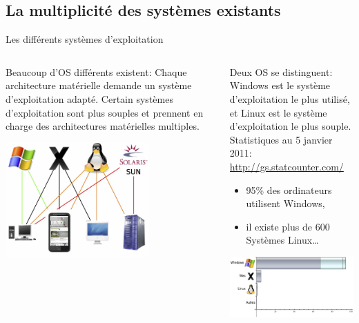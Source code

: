 \subsection{La multiplicité des systèmes existants}
\begin{frame}{Les différents systèmes d'exploitation}
  \begin{columns}
    \begin{column}{5.5cm}
      \begin{block}{Beaucoup d'OS différents existent:}
        Chaque architecture matérielle  demande un système d'exploitation adapté. Certain systèmes d'exploitation sont plus souples et prennent en charge des architectures matérielles multiples.
      \end{block}
      \begin{center}
        \includegraphics[width=5.5cm]{img/s01/OS_archi.jpg}
      \end{center}
    \end{column}
    \begin{column}{5.5cm}
      \begin{block}{Deux OS se distinguent:}
        Windows est le système d'exploitation le plus utilisé, et Linux est le système d'exploitation le plus souple.\\
        Statistiques au 5 janvier 2011: \url{http://gs.statcounter.com/}\\
        \begin{itemize}
        \item 95\% des ordinateurs utilisent Windows,
        \item il existe plus de 600 Systèmes Linux\dots
        \end{itemize}
      \end{block}
      \vrule
      \begin{center}
        \includegraphics[width=5.5cm]{img/s01/OS_utilises.jpg}
      \end{center}
    \end{column}
  \end{columns}
\end{frame}

